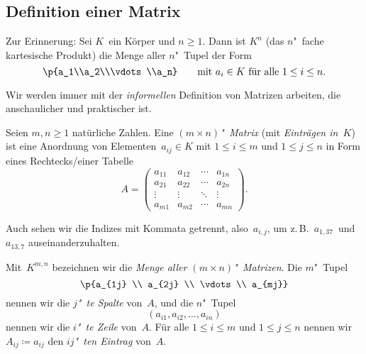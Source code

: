 \documentclass[a4paper]{article}
\begin{document}
\subsection{Definition einer Matrix}

Zur Erinnerung: Sei $K$~ein Körper und $n \geq 1$. Dann ist $K^n$ (das $n$"~fache kartesische Produkt) die Menge aller $n$"~Tupel der Form
\begin{equation*}
    \p{a_1\\a_2\\\vdots\\a_n} \qquad\text{mit } a_i \in K \text{ für alle } 1 \leq i \leq n.
\end{equation*}

Wir werden immer mit der \emph{informellen} Definition von Matrizen arbeiten, die anschaulicher und praktischer ist.

\begin{definition}
    Seien $m,n \geq 1$ natürliche Zahlen. Eine \emph{$(m\times n)$"~Matrix} (mit \emph{Einträgen in~$K$}) ist eine Anordnung von Elementen~$a_{ij} \in K$ mit $1 \leq i \leq m$ und $1 \leq j \leq n$ in Form eines Rechtecks\slash einer Tabelle
    \begin{equation*}
        A =
        \begin{pmatrix}
            a_{11} & a_{12} & \cdots & a_{1n} \\
            a_{21} & a_{22} & \cdots & a_{2n} \\
            \vdots & \vdots & \ddots & \vdots \\
            a_{m1} & a_{m2} & \cdots & a_{mn}
        \end{pmatrix}.
    \end{equation*}
\end{definition}

Auch sehen wir die Indizes mit Kommata getrennt, also~$a_{i,j}$, um z.\,B.\ $a_{1, 37}$~und~$a_{13, 7}$ auseinanderzuhalten.

\begin{notation}
    Mit~$K^{m,n}$ bezeichnen wir die \emph{Menge aller $(m\times n)$"~Matrizen}. Die $m$"~Tupel
    \begin{equation*}
        \p{a_{1j} \\ a_{2j} \\ \vdots \\ a_{mj}}
    \end{equation*}
    nennen wir die \emph{$j$"~te Spalte} von~$A$, und die $n$"~Tupel
    \begin{equation*}
        (a_{i1}, a_{i2}, \dots, a_{in})
    \end{equation*}
    nennen wir die \emph{$i$"~te Zeile} von~$A$. Für alle $1 \leq i \leq m$ und $1 \leq j \leq n$ nennen wir $A_{ij} \coloneqq a_{ij}$ den \emph{$ij$"~ten Eintrag} von~$A$.
\end{notation}
\end{document}
